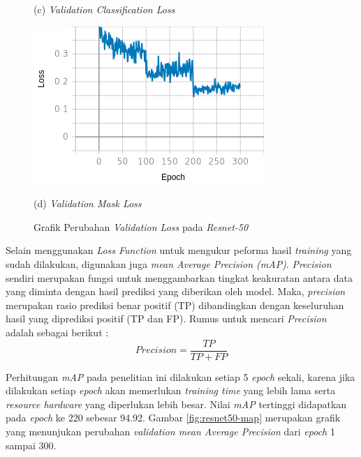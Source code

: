 \begin{figure}[H]
\begin{minipage}{0.45\textwidth}
		\caption*{(c) \textit{Validation Classification Loss}}
	\end{minipage}
	\hfill
	\begin{minipage}{0.45\textwidth}
		\includegraphics[width=\textwidth]{gambar/training_resnet50/tugas-akhir-Page-13 (3).png}
		\caption*{(d) \textit{Validation Mask Loss}}
	\end{minipage}
	\caption{Grafik Perubahan \textit{Validation Loss} pada \textit{Resnet-50}}
	\label{fig:resnet50-val}
\end{figure}

Selain menggunakan \textit{Loss Function} untuk mengukur peforma hasil \textit{training} yang sudah dilakukan, digunakan juga \textit{mean Average Precision (mAP)}. \textit{Precision} sendiri merupakan fungsi untuk menggambarkan tingkat keakuratan antara data yang diminta dengan hasil prediksi yang diberikan oleh model. Maka, \textit{precision} merupakan rasio prediksi benar positif (TP) dibandingkan dengan keseluruhan hasil yang diprediksi positif (TP dan FP). Rumus untuk mencari \textit{Precision} adalah sebagai berikut :
\begin{equation}
	Precision = \frac{TP}{TP+FP} 
\end{equation}

Perhitungan \textit{mAP} pada penelitian ini dilakukan setiap 5 \textit{epoch} sekali, karena jika dilakukan setiap \textit{epoch} akan memerlukan \textit{training time} yang lebih lama serta \textit{resource hardware} yang diperlukan lebih besar. Nilai \textit{mAP} tertinggi didapatkan pada \textit{epoch} ke 220 sebesar 94.92. Gambar \ref{fig:resnet50-map} merupakan grafik yang menunjukan perubahan \textit{validation mean Average Precision} dari \textit{epoch} 1 sampai 300. 

